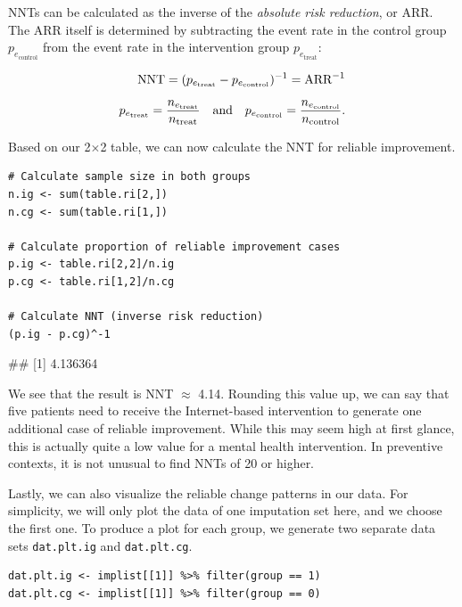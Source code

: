 NNTs can be calculated as the inverse of the \emph{absolute risk reduction}, or ARR. The ARR itself is determined by subtracting the event rate in the control group $p_{e_{\text{control}}}$ from the event rate in the intervention group $p_{e_{\text{treat}}}$: 

\begin{align}
\openup 2\jot
\begin{split}
\text{NNT} = (p_{e_{\text{treat}}} - p_{e_{\text{control}}})^{-1} = \text{ARR}^{-1} \\
p_{e_{\text{treat}}} = \frac{n_{{e}_{\text{treat}}}}{n_{\text{treat}}} ~~~ \text{and} ~~~ p_{e_{\text{control}}} =\frac{n_{{e}_{\text{control}}}}{n_{\text{control}}}.
\end{split}
\end{align}

Based on our 2$\times$2 table, we can now calculate the NNT for reliable improvement.

\begin{lstlisting}
# Calculate sample size in both groups
n.ig <- sum(table.ri[2,])
n.cg <- sum(table.ri[1,])

# Calculate proportion of reliable improvement cases
p.ig <- table.ri[2,2]/n.ig
p.cg <- table.ri[1,2]/n.cg

# Calculate NNT (inverse risk reduction)
(p.ig - p.cg)^-1
\end{lstlisting}

\begin{example}
## [1] 4.136364
\end{example}

We see that the result is NNT $\approx$ 4.14. Rounding this value up, we can say that five patients need to receive the Internet-based intervention to generate one additional case of reliable improvement. While this may seem high at first glance, this is actually quite a low value for a mental health intervention. In preventive contexts, it is not unusual to find NNTs of 20 or higher.

Lastly, we can also visualize the reliable change patterns in our data. For simplicity, we will only plot the data of one imputation set here, and we choose the first one. To produce a plot for each group, we generate two separate data sets \texttt{dat.plt.ig} and \texttt{dat.plt.cg}.

\begin{lstlisting}
dat.plt.ig <- implist[[1]] %>% filter(group == 1)
dat.plt.cg <- implist[[1]] %>% filter(group == 0)
\end{lstlisting}

